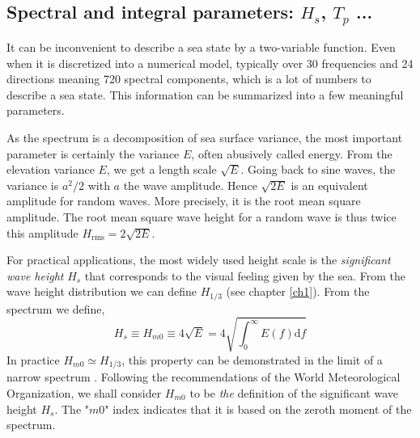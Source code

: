 \subsection{Spectral and integral parameters: $H_s$, $T_p$ ...}\label{sub:param}
It can
be inconvenient  to describe a sea state by a two-variable function. Even when it is discretized into a numerical model,  typically 
over 30 frequencies and 24 directions meaning 720 spectral components, which is a lot of numbers to describe a sea state. This information can be 
summarized into a few meaningful parameters.

As the spectrum is a decomposition of sea surface variance, the most important parameter is certainly the variance $E$, often abusively called
energy. From the elevation variance $E$, we get a length scale  $\sqrt{E}$. Going back to sine waves, the variance is $a^2/2$ with $a$ the wave amplitude. Hence $\sqrt{2 E}$
is an equivalent amplitude  for random waves. More precisely, it is 
the root mean square amplitude. The root mean square wave height for a random wave is thus twice this amplitude
$H_{\mathrm{rms}}=2 \sqrt{2E}$.

For practical applications, the most widely used height scale is the \textit{significant wave height} $H_s$ that corresponds to the visual 
feeling given by the sea. From the wave height distribution we can define $H_{1/3}$ (see chapter \ref{ch1}). From the spectrum we define,
\begin{equation}
H_s \equiv H_{m0}\equiv 4 \sqrt{E} = 4 \sqrt{\int_{0}^{\infty} E(f) {\mathrm d}f}
\label{eq3.14}
\end{equation}
In practice $H_{m0} \simeq H_{1/3}$, this property can be demonstrated in the limit of a narrow spectrum \citep{Longuet-Higgins1952}. Following the recommendations of 
the World Meteorological Organization, 
we shall consider $H_{m0}$ to be \emph{the} definition of the significant wave height $H_s$. The "$m0$" index indicates that it is based on the zeroth moment of the spectrum. 


